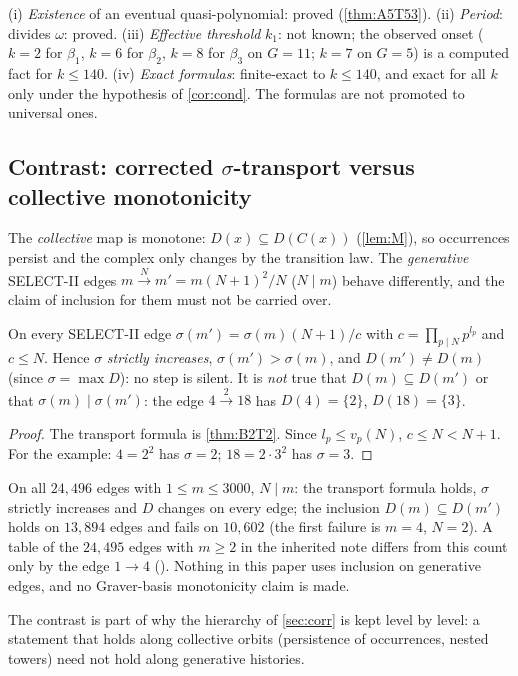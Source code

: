 \begin{remark}
(i) \emph{Existence} of an eventual quasi-polynomial: proved (\cref{thm:A5T53}). (ii) \emph{Period}: divides $\omega$: proved. (iii) \emph{Effective threshold} $k_1$: not known; the observed onset ($k=2$ for $\beta_1$, $k=6$ for $\beta_2$, $k=8$ for $\beta_3$ on $G=11$; $k=7$ on $G=5$) is a computed fact for $k\le140$. (iv) \emph{Exact formulas}: finite-exact to $k\le140$, and exact for all $k$ only under the hypothesis of \cref{cor:cond}. The formulas are not promoted to universal ones.
\end{remark}

\subsection{Contrast: corrected \texorpdfstring{$\sigma$}{sigma}-transport versus collective monotonicity}\label{ssec:contrast}
The \emph{collective} map is monotone: $D(x)\subseteq D(C(x))$ (\cref{lem:M}), so occurrences persist and the complex only changes by the transition law. The \emph{generative} SELECT-II edges $m\xrightarrow{N}m'=m(N+1)^2/N$ ($N\mid m$) behave differently, and the claim of inclusion for them must not be carried over.
\begin{proposition}\label{prop:B2T9}
On every SELECT-II edge $\sigma(m')=\sigma(m)(N+1)/c$ with $c=\prod_{p\mid N}p^{l_p}$ and $c\le N$. Hence $\sigma$ \emph{strictly increases}, $\sigma(m')>\sigma(m)$, and $D(m')\ne D(m)$ (since $\sigma=\max D$): no step is silent. It is \emph{not} true that $D(m)\subseteq D(m')$ or that $\sigma(m)\mid\sigma(m')$: the edge $4\xrightarrow{2}18$ has $D(4)=\{2\}$, $D(18)=\{3\}$.
\end{proposition}
\begin{proof}
The transport formula is \cref{thm:B2T2}. Since $l_p\le v_p(N)$, $c\le N<N+1$. For the example: $4=2^2$ has $\sigma=2$; $18=2\cdot3^2$ has $\sigma=3$. \qedhere
\end{proof}
\begin{remark}
On all $24{,}496$ edges with $1\le m\le3000$, $N\mid m$: the transport formula holds, $\sigma$ strictly increases and $D$ changes on every edge; the inclusion $D(m)\subseteq D(m')$ holds on $13{,}894$ edges and fails on $10{,}602$ (the first failure is $m=4$, $N=2$). A table of the $24{,}495$ edges with $m\ge2$ in the inherited note differs from this count only by the edge $1\to4$ (). Nothing in this paper uses inclusion on generative edges, and no Graver-basis monotonicity claim is made.
\end{remark}
\begin{remark}
The contrast is part of why the hierarchy of \cref{sec:corr} is kept level by level: a statement that holds along collective orbits (persistence of occurrences, nested towers) need not hold along generative histories.
\end{remark}

